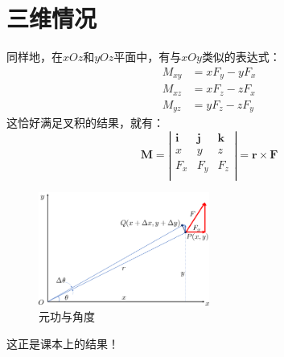 \section{三维情况}
同样地，在$xOz$和$yOz$平面中，有与$xOy$类似的表达式：
\begin{align}
  M_{xy}&=xF_y-yF_x \\
  M_{xz}&=xF_z-zF_x \\
  M_{yz}&=yF_z-zF_y
\end{align}
这恰好满足叉积的结果，就有：
\begin{equation}
  \bm{M}=\left|
      \begin{array}{ccc}
        \bm{i} & \bm{j} & \bm{k} \\
        x & y & z \\
        F_x & F_y & F_z \\
      \end{array}
    \right|=\bm{r}\times\bm{F}
\end{equation}
\begin{figure}
  \centering
  \includegraphics[width=0.5\textwidth]{pic2.png}
  \caption{元功与角度}\label{2}
\end{figure}
这正是课本上的结果！
